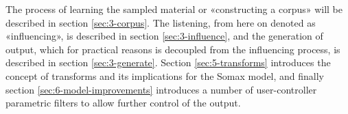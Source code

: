 The process of learning the sampled material or «constructing a corpus» will be described in section \ref{sec:3-corpus}. The listening, from here on denoted as «influencing», is described in section \ref{sec:3-influence}, and the generation of output, which for practical reasons is decoupled from the influencing process, is described in section \ref{sec:3-generate}. Section \ref{sec:5-transforms} introduces the concept of transforms and its implications for the Somax model, and finally section \ref{sec:6-model-improvements} introduces a number of user-controller parametric filters to allow further control of the output.


